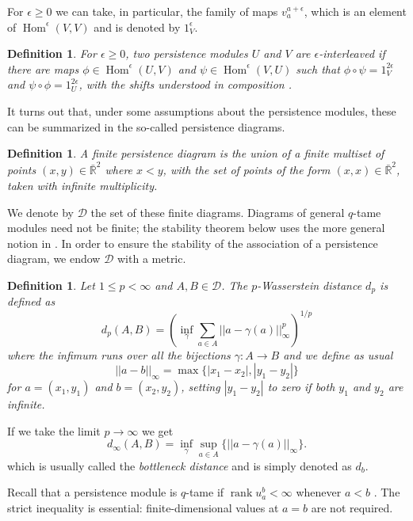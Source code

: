 \documentclass{amsart}
\newcommand{\R}{\mathbb{R}}
\newcommand{\D}{\mathcal{D}}
\newcommand{\ar}{\longrightarrow}
\DeclareMathOperator{\Hom}{Hom}
\DeclareMathOperator{\rank}{rank}
\newtheorem{definition}[theorem]{Definition}
\begin{document}
For $\epsilon \geq 0$ we can take, in particular, the family of maps $v_a^{a+\epsilon}$, which is an element of $\Hom^\epsilon(V, V)$ and is denoted by $1_V^\epsilon$.
\begin{definition}
    For $\epsilon\geq0$, two persistence modules $U$ and $V$ are $\epsilon$-interleaved if there are maps $\phi\in \Hom^\epsilon(U,V)$ and $\psi\in\Hom^\epsilon(V,U)$ such that $\phi\circ\psi=1_V^{2\epsilon}$ and $\psi\circ\phi=1_U^{2\epsilon}$, with the shifts understood in composition \cite[Section~2]{chazal2014persistence_geom}.
\end{definition}

It turns out that, under some assumptions about the persistence modules, these can be summarized in the so-called persistence diagrams.

\begin{definition}
    A finite persistence diagram is the union of a finite multiset of points $(x, y)\in \bar{\R}^2$ where $x<y$,
    with the set of points of the form $(x, x)\in \bar{\R}^2$, taken with infinite multiplicity.
\end{definition}

We denote by $\D$ the set of these finite diagrams. Diagrams of general $q$-tame modules need not be finite; the stability theorem below uses the more general notion in \cite[Section~2]{chazal2014persistence_geom}. In order to ensure the stability of the association of a persistence diagram, we endow $\D$ with a metric. 

\begin{definition}
    Let $1\leq p<\infty$ and $A, B\in \D$. The \emph{$p$-Wasserstein distance} $d_p$ is defined as
    \begin{equation}\label{eq:wasserstein}
    d_p(A, B)=\left(\inf_\gamma\sum_{a\in A}||a-\gamma(a)||_\infty^p \right)^{1/p}
    \end{equation}
    where the infimum runs over all the bijections $\gamma:A\ar B$ and
    we define as usual $$ ||a-b||_\infty=\max\{|x_1-x_2|, |y_1-y_2|\}$$
    for $a=(x_1, y_1)$ and $b=(x_2, y_2)$,
    setting $|y_1-y_2|$ to zero if both $y_1$ and $y_2$ are infinite.
\end{definition}   

If we take the limit $p\ar \infty$ we get 
$$d_\infty(A, B)=\inf_{\gamma}\sup_{a\in A}\{||a-\gamma(a)||_\infty\}.  $$
which is usually called the \textit{bottleneck distance} and is simply denoted as $d_b$.


Recall that a persistence module is $q$-tame if $\rank u_a^b<\infty$ whenever $a<b$ \cite[Section~2, Theorem~2.3]{chazal2014persistence_geom}. The strict inequality is essential: finite-dimensional values at $a=b$ are not required. 
\end{document}
